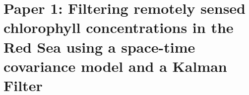 \chapter{\quad Paper 1: Filtering remotely sensed chlorophyll concentrations in the Red Sea using a space-time covariance model and a Kalman Filter}
\label{appendixB}


